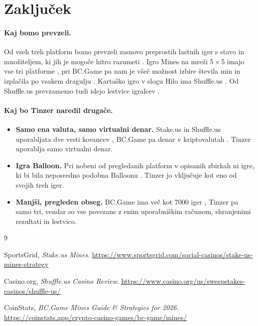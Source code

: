\documentclass[a4paper,12pt]{article}
\begin{document}
\section{Zaključek}
\paragraph{Kaj bomo prevzeli.} Od vseh treh platform bomo prevzeli zasnovo preprostih lastnih iger s stavo in množiteljem, ki jih je mogoče hitro razumeti \cite{stakeus,shuffleus,bcgame}. Igro Mines na mreži 5\,$\times$\,5 imajo vse tri platforme \cite{stakeus,shuffleus,bcgame}, pri BC.Game pa nam je všeč možnost izbire števila min in izplačila po vsakem dragulju \cite{bcgame}. Kartaško igro v slogu Hilo ima Shuffle.us \cite{shuffleus}. Od Shuffle.us prevzamemo tudi idejo lestvice igralcev \cite{shuffleus}.

\paragraph{Kaj bo Tinzer naredil drugače.}
\begin{itemize}
  \item \textbf{Samo ena valuta, samo virtualni denar.} Stake.us in Shuffle.us uporabljata dve vrsti kovancev \cite{stakeus,shuffleus}, BC.Game pa denar v kriptovalutah \cite{bcgame}. Tinzer uporablja samo virtualni denar.
  \item \textbf{Igra Balloon.} Pri nobeni od pregledanih platform v opisanih zbirkah ni igre, ki bi bila neposredno podobna Balloonu \cite{stakeus,shuffleus,bcgame}. Tinzer jo vključuje kot eno od svojih treh iger.
  \item \textbf{Manjši, pregleden obseg.} BC.Game ima več kot 7000 iger \cite{bcgame}, Tinzer pa samo tri, vendar so vse povezane z enim uporabniškim računom, shranjenimi rezultati in lestvico.
\end{itemize}

\begin{thebibliography}{9}

 SportsGrid, \emph{Stake.us Mines}. \url{https://www.sportsgrid.com/social-casinos/stake-us-mines-strategy}

 Casino.org, \emph{Shuffle.us Casino Review}. \url{https://www.casino.org/us/sweepstakes-casinos/shuffle-us/}

 CoinStats, \emph{BC.Game Mines Guide \& Strategies for 2026}. \url{https://coinstats.app/crypto-casino-games/bc-game/mines/}

\end{thebibliography}
\end{document}

